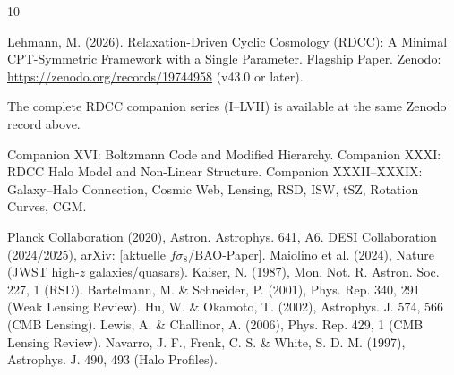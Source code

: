 \documentclass[11pt,a4paper]{article}
\begin{document}
\begin{thebibliography}{10}

 Lehmann, M. (2026). Relaxation-Driven Cyclic Cosmology (RDCC): A Minimal CPT-Symmetric Framework with a Single Parameter. Flagship Paper. Zenodo: \url{https://zenodo.org/records/19744958} (v43.0 or later).

 The complete RDCC companion series (I--LVII) is available at the same Zenodo record above.

 Companion XVI: Boltzmann Code and Modified Hierarchy.
 Companion XXXI: RDCC Halo Model and Non-Linear Structure.
 Companion XXXII--XXXIX: Galaxy--Halo Connection, Cosmic Web, Lensing, RSD, ISW, tSZ, Rotation Curves, CGM.

 Planck Collaboration (2020), Astron. Astrophys. 641, A6.
 DESI Collaboration (2024/2025), arXiv: [aktuelle $f\sigma_8$/BAO-Paper].
 Maiolino et al. (2024), Nature (JWST high-$z$ galaxies/quasars).
 Kaiser, N. (1987), Mon. Not. R. Astron. Soc. 227, 1 (RSD).
 Bartelmann, M. \& Schneider, P. (2001), Phys. Rep. 340, 291 (Weak Lensing Review).
 Hu, W. \& Okamoto, T. (2002), Astrophys. J. 574, 566 (CMB Lensing).
 Lewis, A. \& Challinor, A. (2006), Phys. Rep. 429, 1 (CMB Lensing Review).
 Navarro, J. F., Frenk, C. S. \& White, S. D. M. (1997), Astrophys. J. 490, 493 (Halo Profiles).

\end{thebibliography}
\end{document}
